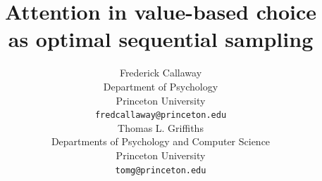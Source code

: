 \documentclass[11pt]{article} %
\title{Attention in value-based choice\\as optimal sequential sampling}
\author{
Frederick Callaway \\
Department of Psychology \\
Princeton University \\
\texttt{fredcallaway@princeton.edu} \\
\And
Thomas L. Griffiths \\
Departments of Psychology and Computer Science \\
Princeton University \\
\texttt{tomg@princeton.edu} \\
}
\begin{document}
\maketitle

\begin{abstract}


\end{abstract}
\end{document}
